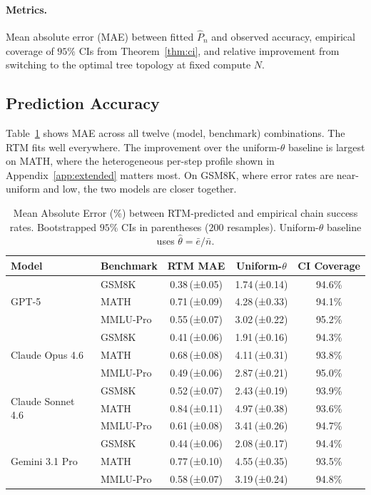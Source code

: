 \documentclass[11pt]{article}
\theoremstyle{plain}
\theoremstyle{definition}
\begin{document}
\paragraph{Metrics.}
Mean absolute error (MAE) between fitted $\hat P_n$ and observed accuracy,
empirical coverage of $95\%$ CIs from Theorem~\ref{thm:ci}, and relative
improvement from switching to the optimal tree topology at fixed compute $N$.

\subsection{Prediction Accuracy}

Table~\ref{tab:mae} shows MAE across all twelve (model, benchmark) combinations.
The RTM fits well everywhere. The improvement over the uniform-$\theta$ baseline
is largest on MATH, where the heterogeneous per-step profile shown in
Appendix~\ref{app:extended} matters most. On GSM8K, where error rates are
near-uniform and low, the two models are closer together.

\begin{table}[ht]
\centering
\caption{Mean Absolute Error (\%) between RTM-predicted and empirical chain
success rates. Bootstrapped $95\%$ CIs in parentheses ($200$ resamples).
Uniform-$\theta$ baseline uses $\hat\theta = \bar{e}/\bar{n}$.}
\label{tab:mae}
\renewcommand{\arraystretch}{1.2}
\begin{tabular}{llccc}
\toprule
\textbf{Model} & \textbf{Benchmark} & \textbf{RTM MAE} & \textbf{Uniform-$\theta$} & \textbf{CI Coverage} \\
\midrule
\multirow{3}{*}{GPT-5}
  & GSM8K    & 0.38\,(±0.05) & 1.74\,(±0.14) & 94.6\% \\
  & MATH     & 0.71\,(±0.09) & 4.28\,(±0.33) & 94.1\% \\
  & MMLU-Pro & 0.55\,(±0.07) & 3.02\,(±0.22) & 95.2\% \\
\midrule
\multirow{3}{*}{Claude Opus 4.6}
  & GSM8K    & 0.41\,(±0.06) & 1.91\,(±0.16) & 94.3\% \\
  & MATH     & 0.68\,(±0.08) & 4.11\,(±0.31) & 93.8\% \\
  & MMLU-Pro & 0.49\,(±0.06) & 2.87\,(±0.21) & 95.0\% \\
\midrule
\multirow{3}{*}{Claude Sonnet 4.6}
  & GSM8K    & 0.52\,(±0.07) & 2.43\,(±0.19) & 93.9\% \\
  & MATH     & 0.84\,(±0.11) & 4.97\,(±0.38) & 93.6\% \\
  & MMLU-Pro & 0.61\,(±0.08) & 3.41\,(±0.26) & 94.7\% \\
\midrule
\multirow{3}{*}{Gemini 3.1 Pro}
  & GSM8K    & 0.44\,(±0.06) & 2.08\,(±0.17) & 94.4\% \\
  & MATH     & 0.77\,(±0.10) & 4.55\,(±0.35) & 93.5\% \\
  & MMLU-Pro & 0.58\,(±0.07) & 3.19\,(±0.24) & 94.8\% \\
\bottomrule
\end{tabular}
\end{table}
\end{document}
